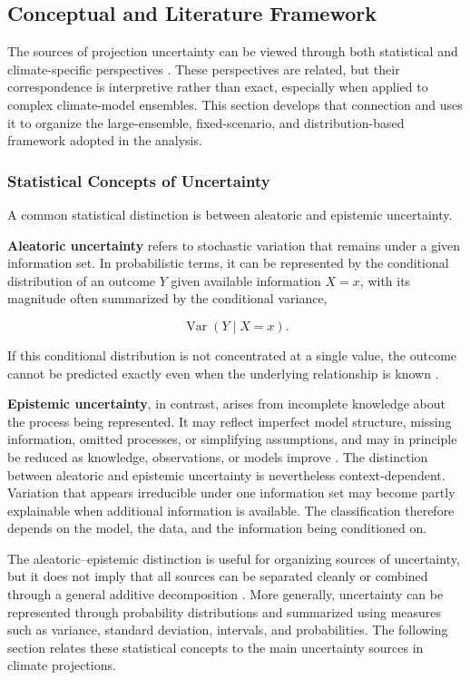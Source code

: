 \documentclass[
]{krantz}
\begin{document}
\subsection{Conceptual and Literature Framework}\label{conceptual-and-literature-framework}

The sources of projection uncertainty can be viewed through both statistical and climate-specific perspectives \citep{Gruber2025, Hawkins2009}. These perspectives are related, but their correspondence is interpretive rather than exact, especially when applied to complex climate-model ensembles. This section develops that connection and uses it to organize the large-ensemble, fixed-scenario, and distribution-based framework adopted in the analysis.

\subsubsection{Statistical Concepts of Uncertainty}\label{statistical-concepts-of-uncertainty}

A common statistical distinction is between aleatoric and epistemic uncertainty.

\textbf{Aleatoric uncertainty} refers to stochastic variation that remains under a given information set. In probabilistic terms, it can be represented by the conditional distribution of an outcome \(Y\) given available information \(X=x\), with its magnitude often summarized by the conditional variance,

\[
\operatorname{Var}(Y \mid X=x).
\]

If this conditional distribution is not concentrated at a single value, the outcome cannot be predicted exactly even when the underlying relationship is known \citep{Gruber2025}.

\textbf{Epistemic uncertainty}, in contrast, arises from incomplete knowledge about the process being represented. It may reflect imperfect model structure, missing information, omitted processes, or simplifying assumptions, and may in principle be reduced as knowledge, observations, or models improve \citep{Gruber2025}. The distinction between aleatoric and epistemic uncertainty is nevertheless context-dependent. Variation that appears irreducible under one information set may become partly explainable when additional information is available. The classification therefore depends on the model, the data, and the information being conditioned on.

The aleatoric--epistemic distinction is useful for organizing sources of uncertainty, but it does not imply that all sources can be separated cleanly or combined through a general additive decomposition \citep{Gruber2025}. More generally, uncertainty can be represented through probability distributions and summarized using measures such as variance, standard deviation, intervals, and probabilities. The following section relates these statistical concepts to the main uncertainty sources in climate projections.
\end{document}
